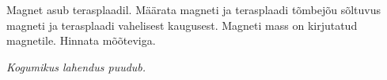 
Magnet asub terasplaadil. Määrata magneti ja terasplaadi tõmbejõu sõltuvus magneti ja terasplaadi vahelisest kaugusest. Magneti mass on kirjutatud magnetile. Hinnata mõõteviga.

\hint

\solu
\textit{Kogumikus lahendus puudub.}
\probend
